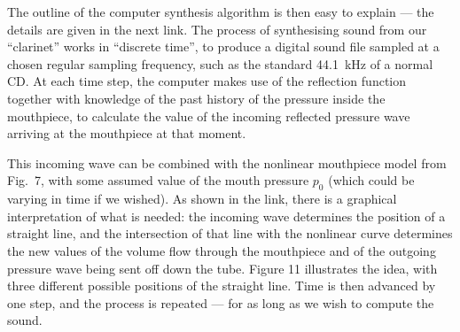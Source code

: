 
  The outline of the computer synthesis algorithm is then easy to explain — the 
  details are given in the next link. The process of synthesising sound from 
  our “clarinet” works in “discrete time”, to produce a digital sound file 
  sampled at a chosen regular sampling frequency, such as the standard 44.1~kHz 
  of a normal CD. At each time step, the computer makes use of the reflection 
  function together with knowledge of the past history of the pressure inside 
  the mouthpiece, to calculate the value of the incoming reflected pressure 
  wave arriving at the mouthpiece at that moment. 

  This incoming wave can be combined with the nonlinear mouthpiece model from 
  Fig.\ 7, with some assumed value of the mouth pressure $p_0$ (which could be 
  varying in time if we wished). As shown in the link, there is a graphical 
  interpretation of what is needed: the incoming wave determines the position 
  of a straight line, and the intersection of that line with the nonlinear 
  curve determines the new values of the volume flow through the mouthpiece and 
  of the outgoing pressure wave being sent off down the tube. Figure 11 
  illustrates the idea, with three different possible positions of the straight 
  line. Time is then advanced by one step, and the process is repeated — for as 
  long as we wish to compute the sound. 


